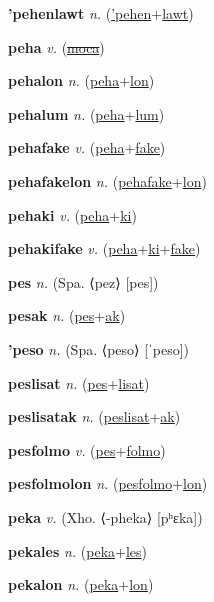 \textbf{\hypertarget{'pehenlawt}{'pehenlawt}} \textit{n.} (\hyperlink{'pehen}{'pehen}+\allowbreak \hyperlink{lawt}{lawt})


\textbf{\hypertarget{peha}{peha}} \textit{v.} (\hyperlink{moca}{\sout{moca}})


\textbf{\hypertarget{pehalon}{pehalon}} \textit{n.} (\hyperlink{peha}{peha}+\allowbreak \hyperlink{lon}{lon})


\textbf{\hypertarget{pehalum}{pehalum}} \textit{n.} (\hyperlink{peha}{peha}+\allowbreak \hyperlink{lum}{lum})


\textbf{\hypertarget{pehafake}{pehafake}} \textit{v.} (\hyperlink{peha}{peha}+\allowbreak \hyperlink{fake}{fake})


\textbf{\hypertarget{pehafakelon}{pehafakelon}} \textit{n.} (\hyperlink{pehafake}{pehafake}+\allowbreak \hyperlink{lon}{lon})


\textbf{\hypertarget{pehaki}{pehaki}} \textit{v.} (\hyperlink{peha}{peha}+\allowbreak \hyperlink{ki}{ki})


\textbf{\hypertarget{pehakifake}{pehakifake}} \textit{v.} (\hyperlink{peha}{peha}+\allowbreak \hyperlink{ki}{ki}+\allowbreak \hyperlink{fake}{fake})


\textbf{\hypertarget{pes}{pes}} \textit{n.} (Spa. ⟨pez⟩ [pes])


\textbf{\hypertarget{pesak}{pesak}} \textit{n.} (\hyperlink{pes}{pes}+\allowbreak \hyperlink{ak}{ak})


\textbf{\hypertarget{'peso}{'peso}} \textit{n.} (Spa. ⟨peso⟩ [ˈpeso])


\textbf{\hypertarget{peslisat}{peslisat}} \textit{n.} (\hyperlink{pes}{pes}+\allowbreak \hyperlink{lisat}{lisat})


\textbf{\hypertarget{peslisatak}{peslisatak}} \textit{n.} (\hyperlink{peslisat}{peslisat}+\allowbreak \hyperlink{ak}{ak})


\textbf{\hypertarget{pesfolmo}{pesfolmo}} \textit{v.} (\hyperlink{pes}{pes}+\allowbreak \hyperlink{folmo}{folmo})


\textbf{\hypertarget{pesfolmolon}{pesfolmolon}} \textit{n.} (\hyperlink{pesfolmo}{pesfolmo}+\allowbreak \hyperlink{lon}{lon})


\textbf{\hypertarget{peka}{peka}} \textit{v.} (Xho. ⟨-pheka⟩ [pʰɛka])


\textbf{\hypertarget{pekales}{pekales}} \textit{n.} (\hyperlink{peka}{peka}+\allowbreak \hyperlink{les}{les})


\textbf{\hypertarget{pekalon}{pekalon}} \textit{n.} (\hyperlink{peka}{peka}+\allowbreak \hyperlink{lon}{lon})


